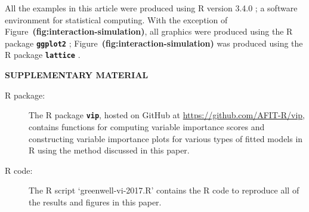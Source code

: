 \documentclass[12pt]{article}
\newcommand{\pkg}[1]{\texorpdfstring%
{{\normalfont\fontseries{b}\selectfont #1}}%
{#1}}
\newcommand{\file}[1]{{`\normalfont\textsf{#1}'}}
\def\pkg#1{\textbf{\texttt{#1}}}
\def\ref#1{\textbf{(#1)}}
\begin{document}
All the examples in this article were produced using R version 3.4.0 \citep{R}; a software environment for statistical computing. With the exception of Figure~\ref{fig:interaction-simulation}, all graphics were produced using the R package \pkg{ggplot2} \citep{pkg-ggplot2}; Figure~\ref{fig:interaction-simulation} was produced using the R package \pkg{lattice} \citep{pkg-lattice}.



\bigskip
\begin{center}
{\large\bf SUPPLEMENTARY MATERIAL}
\end{center}

\begin{description}

\item[R package:] The R package \pkg{vip}, hosted on GitHub at \url{https://github.com/AFIT-R/vip}, contains functions for computing variable importance scores and constructing variable importance plots for various types of fitted models in R using the method discussed in this paper.

\item[R code:] The R script \file{greenwell-vi-2017.R} contains the R code to reproduce all of the results and figures in this paper.

\end{description}






\end{document}
